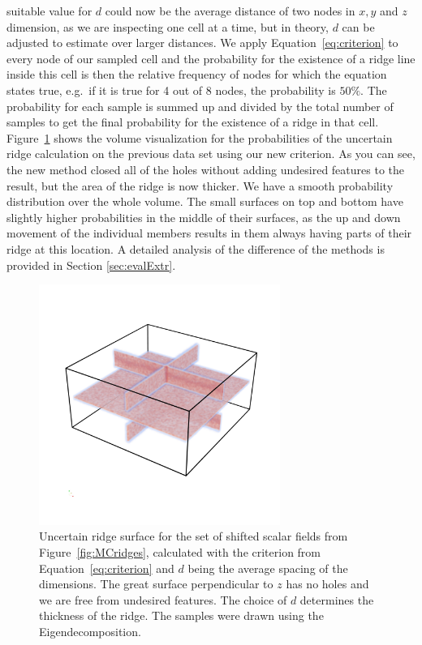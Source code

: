suitable value for $d$ could now be the average distance of two nodes in
$x, y$ and $z$ dimension, as we are inspecting one cell at a time, but
in theory, $d$ can be adjusted to estimate over larger distances. We
apply Equation~\ref{eq:criterion} to every node of our sampled cell and
the probability for the existence of a ridge line inside this cell is
then the relative frequency of nodes for which the equation states true,
e.g.\, if it is true for 4 out of 8 nodes, the probability is $50\%$.
The probability for each sample is summed up and divided by the total
number of samples to get the final probability for the existence of a
ridge in that cell.\\
\indent Figure~\ref{fig:newmethod} shows the volume visualization for
the probabilities of the uncertain ridge calculation on the previous
data set using our new criterion. As you can see, the new method closed
all of the holes without adding undesired features to the result, but
the area of the ridge is now thicker. We have a smooth probability
distribution over the whole volume. The small surfaces on top and bottom
have slightly higher probabilities in the middle of their surfaces, as
the up and down movement of the individual members results in them
always having parts of their ridge at this location. A detailed analysis
of the difference of the methods is provided in Section
\ref{sec:evalExtr}.

\begin{figure}[]
    \centering
    \includegraphics[trim=0 350 0 300, clip=true, width=0.7\textwidth]{Images/lowuncnew.png}
    \caption{Uncertain ridge surface for the set of shifted scalar
    fields from Figure~\ref{fig:MCridges}, calculated with the criterion
    from Equation~\ref{eq:criterion} and $d$ being the average spacing
    of the dimensions. The great surface perpendicular to $z$ has no
    holes and we are free from undesired features. The choice of $d$
    determines the thickness of the ridge. The samples were drawn using
    the Eigendecomposition.}
    \label{fig:newmethod}
\end{figure}


